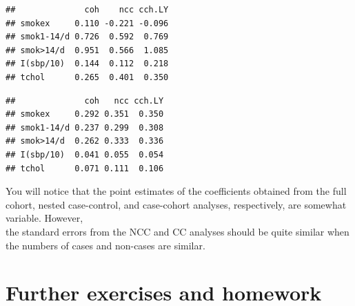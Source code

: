 \documentclass[
]{book}
\newenvironment{Shaded}{\begin{snugshade}}{\end{snugshade}}
\newcommand{\DecValTok}[1]{\textcolor[rgb]{0.00,0.00,0.81}{#1}}
\newcommand{\FunctionTok}[1]{\textcolor[rgb]{0.13,0.29,0.53}{\textbf{#1}}}
\newcommand{\NormalTok}[1]{#1}
\newcommand{\OtherTok}[1]{\textcolor[rgb]{0.56,0.35,0.01}{#1}}
\newcommand{\SpecialCharTok}[1]{\textcolor[rgb]{0.81,0.36,0.00}{\textbf{#1}}}
\begin{document}
\begin{verbatim}
##              coh    ncc cch.LY
## smokex     0.110 -0.221 -0.096
## smok1-14/d 0.726  0.592  0.769
## smok>14/d  0.951  0.566  1.085
## I(sbp/10)  0.144  0.112  0.218
## tchol      0.265  0.401  0.350
\end{verbatim}

\begin{Shaded}
\end{Shaded}

\begin{verbatim}
##              coh   ncc cch.LY
## smokex     0.292 0.351  0.350
## smok1-14/d 0.237 0.299  0.308
## smok>14/d  0.262 0.333  0.336
## I(sbp/10)  0.041 0.055  0.054
## tchol      0.071 0.111  0.106
\end{verbatim}

You will notice that the point estimates of the coefficients
obtained from the full cohort, nested case-control, and case-cohort analyses,
respectively, are somewhat variable. However,\\
the standard errors from the NCC and CC
analyses should be quite similar when the numbers of cases and non-cases are similar.

\section{Further exercises and homework}\label{further-exercises-and-homework}
\end{document}
